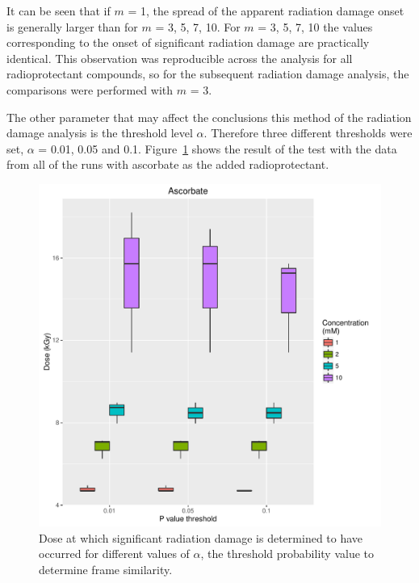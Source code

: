It can be seen that if $m$ = 1, the spread of the apparent radiation damage onset is generally larger than for $m$ = 3, 5, 7, 10.
For $m$ = 3, 5, 7, 10 the values corresponding to the onset of significant radiation damage are practically identical.
This observation was reproducible across the analysis for all radioprotectant compounds, so for the subsequent radiation damage analysis, the comparisons were performed with $m$ = 3.

The other parameter that may affect the conclusions this method of the radiation damage analysis is the threshold level $\alpha$. Therefore three different thresholds were set, $\alpha$ = 0.01, 0.05 and 0.1.
Figure~\ref{fig:alpha threshold value test} shows the result of the test with the data from all of the runs with ascorbate as the added radioprotectant.
\begin{figure}
    \centering
    \includegraphics[width=1.0\textwidth]{figures/saxs/Ascorbate_PThresh_comp.pdf}
    \caption[Dose at which significant radiation damage is determined to have occurred for different values of $\alpha$, the threshold probability value to determine frame similarity.]{Dose at which significant radiation damage is determined to have occurred for different values of $\alpha$, the threshold probability value to determine frame similarity.}
    \label{fig:alpha threshold value test}
\end{figure}
